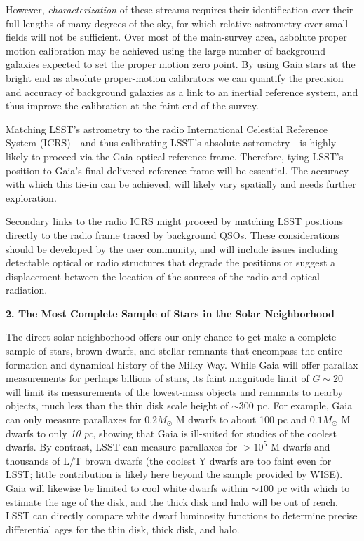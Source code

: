 However, {\it characterization} of these streams requires their
  identification over their full lengths of many degrees of the sky, for which relative astrometry over small fields will not be
sufficient. Over most of the main-survey area, asbolute proper
  motion calibration may be achieved using the large number of
  background galaxies expected \citep[e.g.][]{IvezicEtal2008} to set
  the proper motion zero point. By using Gaia stars at the
  bright end as absolute proper-motion calibrators we can quantify the
  precision and accuracy of background galaxies as a link to an
  inertial reference system, and thus improve the calibration at the
  faint end of the survey.

Matching LSST's astrometry to the radio International Celestial Reference System (ICRS) - and thus calibrating LSST's absolute astrometry - is highly likely to proceed via the Gaia optical reference frame. Therefore, tying LSST's position to Gaia's final delivered reference frame will be essential. The accuracy with which this tie-in can be achieved, will likely vary spatially and needs further exploration.

Secondary links to the radio ICRS might proceed by matching LSST positions directly to the radio frame traced by background QSOs. These considerations should be developed by the user community, and will include issues including detectable optical or radio structures that degrade the positions or suggest a displacement between the location of the sources of the radio and optical radiation.

{\bf 2. The Most Complete Sample of Stars in the Solar Neighborhood}

The direct solar neighborhood offers our only chance to get make a complete sample of stars, brown dwarfs, and stellar remnants that encompass the entire formation and dynamical history of the Milky Way. While Gaia will offer parallax measurements for perhaps billions of stars, its faint magnitude limit of $G\sim 20$ will limit its measurements of the lowest-mass objects
and remnants to nearby objects, much less than the thin disk scale height of $\sim 300$ pc. For example, Gaia can only measure parallaxes for $0.2 M_{\odot}$ M dwarfs to about 100 pc
and $0.1 M_{\odot}$ M dwarfs to only \emph{10 pc}, showing that Gaia is ill-suited for studies of the coolest dwarfs. By contrast, LSST can measure parallaxes for $> 10^5$ M dwarfs and thousands of L/T brown dwarfs (the coolest Y dwarfs are too faint even for LSST; little contribution is likely here beyond the sample provided by WISE). Gaia will likewise be limited to cool white dwarfs within $\sim 100$ pc with which to estimate the age of the disk, and the thick disk and halo will be out of reach. LSST can directly compare white dwarf luminosity functions to determine precise differential ages for the thin disk, thick disk, and halo.

